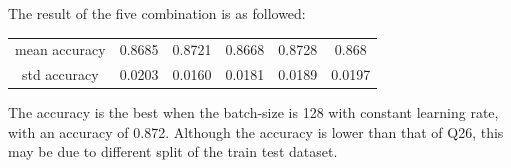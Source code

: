 \documentclass{article}
\begin{document}
\begin{description}
		The result of the five combination is as followed: 
		\begin{center}
			\begin{tabular} {|c|c|c|c|c|c|}
				\hline
				mean accuracy & 0.8685 & 0.8721 & 0.8668 & 0.8728 & 0.868 \\
				std accuracy & 0.0203 & 0.0160 & 0.0181 & 0.0189 & 0.0197 \\
				\hline
			\end{tabular}
		\end{center}
		The accuracy is the best when the batch-size is 128 with constant learning rate, with an accuracy of 0.872. Although the accuracy is lower than that of Q26, this may be due to different split of the train test dataset.
\end{description}
\end{document}

